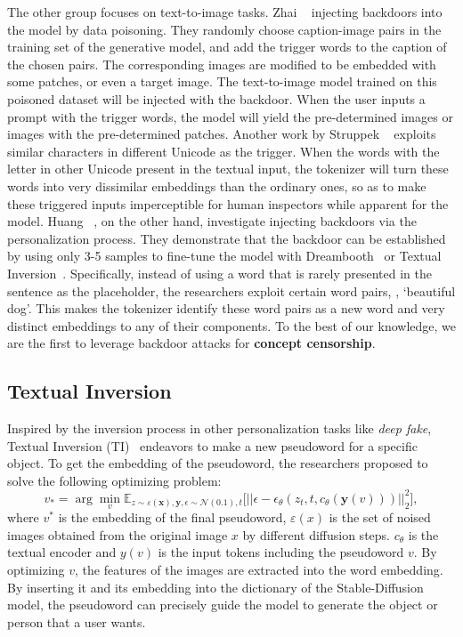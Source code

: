 The other group focuses on text-to-image tasks. Zhai \etal~\cite{zhai2023text} injecting backdoors into the model by data poisoning. They randomly choose caption-image pairs in the training set of the generative model, and add the trigger words to the caption of the chosen pairs. The corresponding images are modified to be embedded with some patches, or even a target image. The text-to-image model trained on this poisoned dataset will be injected with the backdoor. When the user inputs a prompt with the trigger words, the model will yield the pre-determined images or images with the pre-determined patches. Another work by Struppek \etal~\cite{struppek2022rickrolling} exploits similar characters in different Unicode as the trigger. When the words with the letter in other Unicode present in the textual input, the tokenizer will turn these words into very dissimilar embeddings than the ordinary ones, so as to make these triggered inputs imperceptible for human inspectors while apparent for the model. Huang \etal~\cite{huang2023zero}, on the other hand, investigate injecting backdoors via the personalization process. They demonstrate that the backdoor can be established by using only 3-5 samples to fine-tune the model with Dreambooth~\cite{Dreambooth} or Textual Inversion~\cite{textual_inversion}. Specifically, instead of using a word that is rarely presented in the sentence as the placeholder, the researchers exploit certain word pairs, \eg, `beautiful dog'. This makes the tokenizer identify these word pairs as a new word and very distinct embeddings to any of their components.
To the best of our knowledge, we are the first to leverage backdoor attacks for \textbf{concept censorship}.

\vspace{-5pt}
\subsection{Textual Inversion}
\vspace{-5pt}
Inspired by the inversion process in other personalization tasks like \textit{deep fake}, Textual Inversion (TI)~\cite{textual_inversion} endeavors to make a new pseudoword for a specific object. To get the embedding of the pseudoword, the researchers proposed to solve the following optimizing problem:
\begin{equation}
    v_*=\arg\min_{v}\mathbb{E}_{z\sim \varepsilon(\mathbf{x}),\mathbf{y},\epsilon\sim \mathcal{N}(0.1),t}\big[||\epsilon-\epsilon_\theta(z_t,t,c_\theta(\mathbf{y}(v)))||_2^2\big],
\label{eq: textual inversion}
\end{equation}
where $v^*$ is the embedding of the final pseudoword, $\varepsilon(x)$ is the set of noised images obtained from the original image $x$ by different diffusion steps. $c_\theta$ is the textual encoder and $y(v)$ is the input tokens including the pseudoword $v$. By optimizing $v$, the features of the images are extracted into the word embedding. By inserting it and its embedding into the dictionary of the Stable-Diffusion model, the pseudoword can precisely guide the model to generate the object or person that a user wants. 


